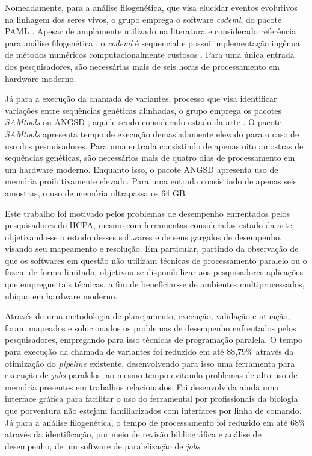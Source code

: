 \documentclass[cic,tc]{iiufrgs}
\begin{document}
Nomeadamente, para a análise filogenética, que visa elucidar eventos evolutivos
na linhagem dos seres vivos, o grupo emprega o software \textit{codeml}, do pacote
PAML \cite{yang2007paml}. Apesar de amplamente utilizado na literatura e
considerado referência para análise filogenética \cite{maldonado2016lmap}, o
\textit{codeml} é sequencial e possui implementação ingênua de métodos numéricos
computacionalmente custosos \cite{yang2020paml}. Para uma única entrada dos
pesquisadores, são necessárias mais de seis horas de processamento em hardware
moderno.

Já para a execução da chamada de variantes, processo que visa identificar
variações entre sequências genéticas alinhadas, o grupo emprega os pacotes
\textit{SAMtools} \cite{li2009sequence} ou ANGSD \cite{korneliussen2014angsd}, aquele
sendo considerado estado da
arte \cite{poplin2018universal} \cite{yao2020evaluation}. O pacote \textit{SAMtools}
apresenta tempo de execução demasiadamente elevado para o caso de uso dos
pesquisadores. Para uma entrada consistindo de apenas oito amostras de
sequências genéticas, são necessários mais de quatro dias de processamento em
um hardware moderno. Enquanto isso, o pacote ANGSD apresenta uso de memória
proibitivamente elevado. Para uma entrada consistindo de apenas seis amostras,
o uso de memória ultrapassa os 64 GB.

%
%
Este trabalho foi motivado pelos problemas de desempenho enfrentados pelos
pesquisadores do HCPA, mesmo com ferramentas consideradas estado da arte,
objetivando-se o estudo desses softwares e de seus gargalos de
desempenho, visando seu mapeamento e resolução. Em particular, partindo da
observação de que os softwares em questão não utilizam técnicas de
processamento paralelo ou o fazem de forma limitada, objetivou-se
disponibilizar aos pesquisadores aplicações que empregue tais técnicas, a fim
de beneficiar-se de ambientes multiprocessados, ubíquo em hardware moderno.

%
%
Através de uma metodologia de planejamento, execução, validação e atuação,
foram mapeados e solucionados os problemas de desempenho enfrentados pelos
pesquisadores, empregando para isso técnicas de programação paralela. O tempo
para execução da chamada de variantes foi reduzido em até 88,79\% através da
otimização do \textit{pipeline} existente, desenvolvendo para isso uma
ferramenta para execução de \textit{jobs} paralelos, ao mesmo tempo evitando
problemas de alto uso de memória presentes em trabalhos relacionados. Foi
desenvolvida ainda uma interface gráfica para facilitar o uso do ferramental
por profissionais da biologia que porventura não estejam familiarizados com
interfaces por linha de comando. Já para a análise filogenética, o tempo de
processamento foi reduzido em até 68\% através da identificação, por meio de
revisão bibliográfica e análise de desempenho, de um software de paralelização
de \textit{jobs}.
\end{document}
